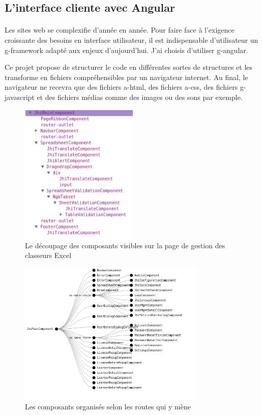\subsection{L'interface cliente avec Angular}
\label{subsec:frontend-angular}

\paragraph{}
Les sites web se complexifie d'année en année.
Pour faire face à l'exigence croissante des besoins en interface utilisateur, il est indispensable d'utilisateur un \gls{g-framework} adapté aux enjeux d'aujourd'hui.
J'ai choisis d'utiliser \Gls{g-angular}.

Ce projet propose de structurer le code en différentes sortes de structures et les transforme en fichiers compréhensibles par un navigateur internet.
Au final, le navigateur ne recevra que des fichiers \gls{a-html}, des fichiers \gls{a-css}, des fichiers \gls{g-javascript} et des fichiers médias comme des images ou des sons par exemple.

\begin{figure}[ht]
    \centering
    \includegraphics[width=0.5\textwidth]{images/diagrams/angular-components.png}
    \caption{Le découpage des composants visibles sur la page de gestion des classeurs Excel}
    \label{fig:angular-components}
\end{figure}

\begin{figure}[ht]
    \centering
    \includegraphics[width=0.8\textwidth]{images/diagrams/angular-routes.png}
    \caption{Les composants organisés selon les routes qui y mène}
    \label{fig:angular-routes}
\end{figure}

